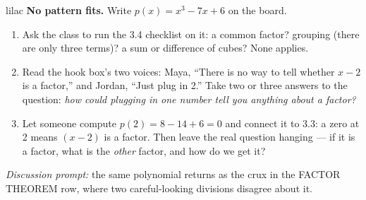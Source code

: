 \documentclass[10pt]{article}
\begin{document}
\begin{skillbox}{lilac}
    \textbf{No pattern fits.} Write $p(x) = x^3 - 7x + 6$ on the board.
    \begin{enumerate}[itemsep=2pt]
        \item Ask the class to run the 3.4 checklist on it: a common factor? grouping (there
              are only three terms)? a sum or difference of cubes? None applies.
        \item Read the hook box's two voices: Maya, ``There is no way to tell whether $x - 2$
              is a factor,'' and Jordan, ``Just plug in 2.'' Take two or three answers to the
              question: \textit{how could plugging in one number tell you anything about a
              factor?}
        \item Let someone compute $p(2) = 8 - 14 + 6 = 0$ and connect it to 3.3: a zero at 2
              means $(x - 2)$ is a factor. Then leave the real question hanging --- if it is a
              factor, what is the \textit{other} factor, and how do we get it?
    \end{enumerate}
    \textit{Discussion prompt:} the same polynomial returns as the crux in the FACTOR THEOREM
    row, where two careful-looking divisions disagree about it.
\end{skillbox}
\end{document}

